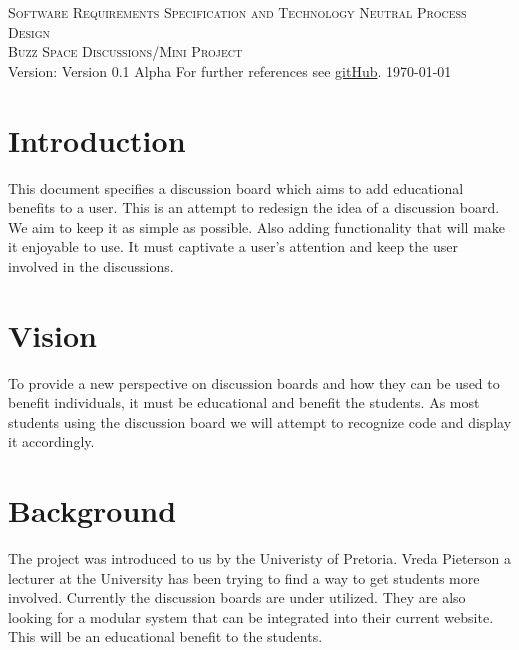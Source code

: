 \documentclass[a4paper,12pt]{report}
\begin{document}
\renewcommand{\thesection}{\arabic{section}}
\newpage
\begin{center}
\textsc{\LARGE Software Requirements Specification and Technology Neutral Process Design}\\[1.5cm]
\textsc{\Large Buzz Space Discussions/Mini Project}\\[0.5cm]
Version: Version 0.1 Alpha 
For further references see \href{http://www.sharelatex.com}{gitHub}.
\today
\end{center}
\tableofcontents{}
\section{Introduction}
This document specifies a discussion board which aims to add educational benefits to a user. This is an attempt to redesign the idea of a discussion board. We aim to keep it as simple as possible. Also adding functionality that will make it enjoyable to use. It must captivate a user's attention and keep the user involved in the discussions. 
\section{Vision}
To provide a new perspective on discussion boards and how they can be used to benefit individuals, it must be educational and benefit the students. As most students using the discussion board we will attempt to recognize code and display it accordingly.
\section{Background}
The project was introduced to us by the Univeristy of Pretoria. Vreda Pieterson a lecturer at the University has been trying to find a way to get students more involved. Currently the discussion boards are under utilized. They are also looking for a modular system that can be integrated into their current website. This will be an educational benefit to the students.
\end{document}
